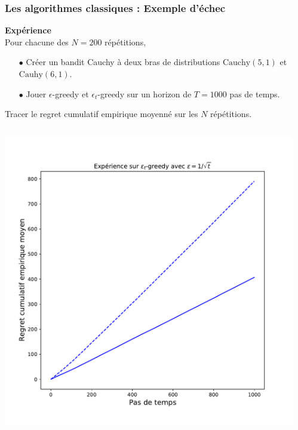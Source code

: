 \documentclass[8pt,sans,aspectratio=169]{beamer}
\begin{document}
\begin{frame}
\frametitle{Les algorithmes classiques : Exemple d'échec}

\textbf{Expérience}\\
Pour chacune des $N=200$ répétitions,\\

\begin{itemize}

\item[$\bullet$] Créer un bandit Cauchy à deux bras de distributions $\mathrm{Cauchy}(5,1)$ et $\mathrm{Cauhy}(6,1).$

\item[$\bullet$] Jouer $\epsilon$-greedy et $\epsilon_t$-greedy sur un horizon de $T=1000$ pas de temps. 
\end{itemize}

Tracer le regret cumulatif empirique moyenné sur les $N$ répétitions.

\vfill
\pause

\begin{columns}[T] %
\begin{column}{0.5\linewidth}

\includegraphics[scale=0.3]{contre-exemple-epsilon-greedy.pdf}

\end{column}
\pause
\begin{column}{0.5\linewidth}


\end{column}
\end{columns}
\end{frame}
\end{document}

